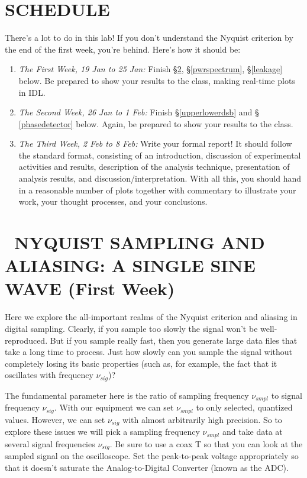 \documentclass[11pt,preprint]{aastex}
\begin{document}
\section{SCHEDULE}

There's a lot to do in this lab! If you don't understand the Nyquist criterion
by the end of the first week, you're behind. Here's how it should be:
\begin{enumerate}

\item {\it The First Week, 19 Jan to 25 Jan:} Finish \S \ref{nyquist},
  \S \ref{pwrspectrum}, \S \ref{leakage} below. Be prepared to show your
  results to the class, making real-time plots in IDL.

\item {\it The Second Week, 26 Jan to 1 Feb:} Finish \S \ref {upperlowerdsb} and \S
  \ref{phasedetector} below. Again, be prepared to show your results to
  the class.

\item {\it The Third Week, 2 Feb to 8 Feb:} Write your formal report!
  It should follow the standard format, consisting of an introduction,
  discussion of experimental activities and results, description of the
  analysis technique, presentation of analysis results, and
  discussion/interpretation. With all this, you should hand in a
  reasonable number of plots together with commentary to illustrate your
  work, your thought processes, and your conclusions.

\end{enumerate}

\section{\ NYQUIST SAMPLING AND ALIASING: A SINGLE SINE WAVE (First Week)} \label{nyquist}

	Here we explore the all-important realms of the Nyquist
criterion and aliasing in digital sampling.  Clearly, if you sample too
slowly the signal won't be well-reproduced.  But if you sample really
fast, then you generate large data files that take a long time to
process.  Just how slowly can you sample the signal without completely
losing its basic properties (such as, for example, the fact that it
oscillates with frequency $\nu_{sig}$)?

The fundamental parameter here is the ratio of sampling frequency
$\nu_{smpl}$ to signal frequency $\nu_{sig}$. With our equipment we can set
$\nu_{smpl}$ to only selected, quantized values. However, we can set
$\nu_{sig}$ with almost arbitrarily high precision. So to explore these
issues we will pick a sampling frequency $\nu_{smpl}$ and take data at
several signal frequencies $\nu_{sig}$.  Be sure to use a coax T so that
you can look at the sampled signal on the oscilloscope.  Set the
peak-to-peak voltage appropriately so that it doesn't saturate the
Analog-to-Digital Converter (known as the ADC).
\end{document}
